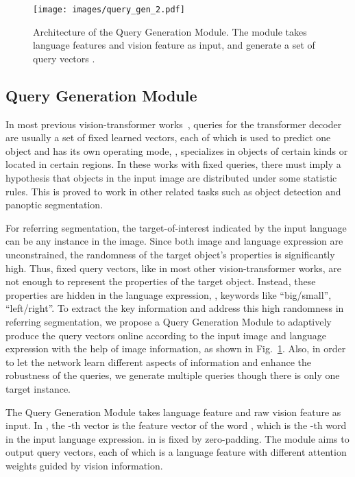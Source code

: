 \documentclass[10pt,twocolumn,letterpaper]{article}
\begin{document}
\begin{figure}[t]
   \begin{center}
      \texttt{[image: images/query\_gen\_2.pdf]}
   \end{center}
    \vspace{-0.1in}
   \caption{Architecture of the Query Generation Module. The module takes language features  and vision feature  as input, and generate a set of query vectors .}
   \vspace{-0.1in}
   \label{fig:query_gen}
\end{figure}
\subsection{Query Generation Module}

In most previous vision-transformer works~\cite{carion2020end}, queries for the transformer decoder are usually a set of fixed learned vectors, each of which is used to predict one object and has its own operating mode, \eg, specializes in objects of certain kinds or located in certain regions. In these works with fixed queries, there must imply a hypothesis that objects in the input image are distributed under some statistic rules. This is proved to work in other related tasks such as object detection and panoptic segmentation.

For referring segmentation, the target-of-interest indicated by the input language can be any instance in the image. Since both image and language expression are unconstrained, the randomness of the target object's properties is significantly high. Thus, fixed query vectors, like in most other vision-transformer works, are not enough to represent the properties of the target object. Instead, these properties are hidden in the language expression, \eg, keywords like ``big/small'', ``left/right''. To extract the key information and address this high randomness in referring segmentation, we propose a Query Generation Module to adaptively produce the query vectors online according to the input image and language expression with the help of image information, as shown in Fig.~\ref{fig:query_gen}. Also, in order to let the network learn different aspects of information and enhance the robustness of the queries, we generate multiple queries though there is only one target instance.

The Query Generation Module takes language feature  and raw vision feature  as input. In , the -th vector is the feature vector of the word , which is the -th word in the input language expression.  in  is fixed by zero-padding. The module aims to output  query vectors, each of which is a language feature with different attention weights guided by vision information.
\end{document}
